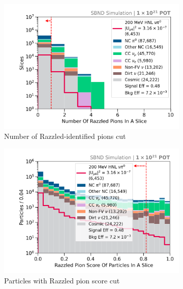 \begin{figure}[ht!]
\begin{subfigure}[b]{0.495\textwidth}
            \centering 
            \includegraphics[width=\textwidth]{nrazzled_pion_precut}
            \caption{Number of Razzled-identified pions cut}%
            \label{fig:nrazzled_pion_full}
        \end{subfigure}
        \hfill
        \begin{subfigure}[b]{0.495\textwidth}   
            \centering 
            \includegraphics[width=\textwidth]{razzled_pion_score_precut}
            \caption{Particles with Razzled pion score cut}%
            \label{fig:razzled_pion_score_full}
        \end{subfigure}
	\hfill
        \begin{subfigure}[b]{0.495\textwidth}   
            \centering 

\end{subfigure}
\end{figure}
